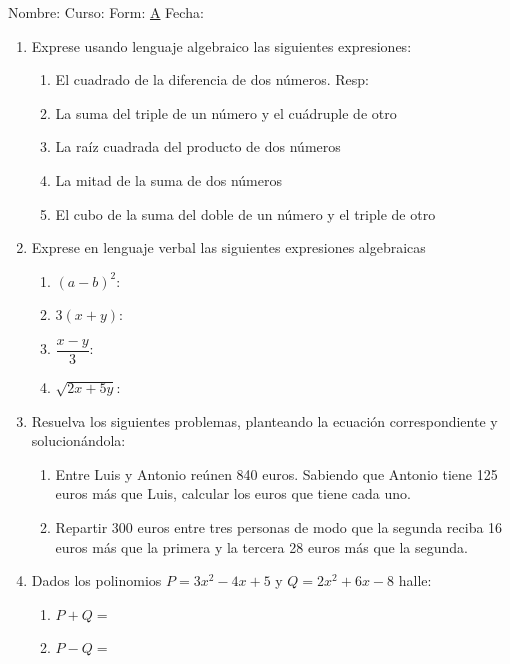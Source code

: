 \documentclass[letterpaper,fleqn]{article}
\newcommand{\LineaNombre}{%
\par
\vspace{\baselineskip}
Nombre:\hrulefill \; Curso: \underline{\hspace*{48pt}} \; Form: \underline{A} \; Fecha: \underline{\hspace*{2.5cm}} \relax
\par}
\begin{document}
\LineaNombre
\begin{enumerate}
 \item Exprese usando lenguaje algebraico las siguientes expresiones:
 \begin{enumerate}
  \item El cuadrado de la diferencia de dos números. \hspace{1cm} Resp: \hrulefill 
  \item La suma del triple de un número y el cuádruple de otro 
  \item La raíz cuadrada del producto de dos números
  \item La mitad de la suma de dos números 
  \item El cubo de la suma del doble de un número y el triple de otro 
 \end{enumerate}
\item Exprese en lenguaje verbal las siguientes expresiones algebraicas
\begin{enumerate}
 \item $(a-b)^{2}$:
 \item $3(x+y)$: 
 \item $\dfrac{x-y}{3}$:
 \item $\sqrt{2x+5y}$:
\end{enumerate}
\item Resuelva los siguientes problemas, planteando la ecuación correspondiente y solucionándola:
\begin{enumerate}
 \item  Entre Luis y Antonio reúnen 840 euros. Sabiendo que Antonio tiene 125 euros más que Luis, calcular los euros que tiene cada uno. 
  \item Repartir 300 euros entre tres personas de modo que la segunda reciba 16 euros más que la primera y la tercera 28 euros más que la segunda. 
\end{enumerate}
\item Dados los polinomios $P=3x^{2}-4x+5$ y $Q=2x^{2}+6x-8$ halle:
\begin{enumerate}
 \item $P+Q=$
 \item $P-Q=$

\end{enumerate}
\end{enumerate}
\end{document}

